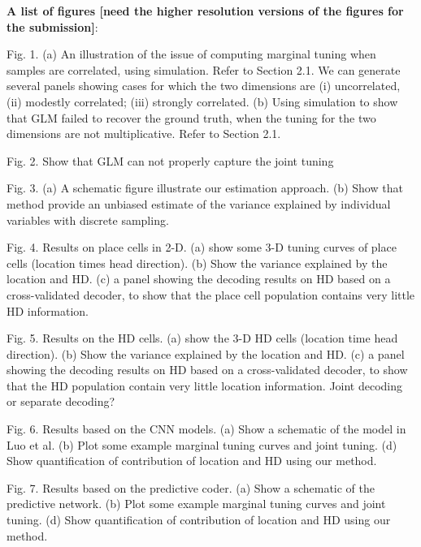 \documentclass[11pt]{article}
\begin{document}
\newpage

{\bf A list of figures [need the higher resolution versions of the figures for the submission]}:


Fig. 1. (a) An illustration of the issue of computing marginal tuning when samples are correlated, using simulation. Refer to Section 2.1. We can generate several panels showing cases for which the two dimensions are (i) uncorrelated, (ii) modestly correlated; (iii) strongly correlated. (b) Using simulation to show that GLM failed to recover the ground truth, when the tuning for the two dimensions are not multiplicative. Refer to Section 2.1. %

Fig. 2. Show that GLM can not properly capture the joint tuning



Fig. 3. (a) A schematic figure illustrate our estimation approach. (b) Show that method provide an unbiased estimate of the variance explained by individual variables with discrete sampling. %

Fig. 4. Results on place cells in 2-D. (a) show some 3-D tuning curves of place cells (location times head direction). (b) Show the variance explained by the location and HD.
(c) a panel showing the decoding results on HD based on a cross-validated decoder, to show that the place cell population contains very little HD information. 

Fig. 5. Results on the HD cells. (a) show the 3-D HD cells (location time head direction). (b) Show the variance explained by the location and HD. (c) a panel showing the decoding results on HD based on a cross-validated decoder, to show that the HD population contain very little location information. Joint decoding or separate decoding?


Fig. 6. Results based on the CNN models. (a) Show a schematic of the model in Luo et al. (b) Plot some example marginal tuning curves and joint tuning. (d) Show quantification of contribution of location and HD using our method. 

Fig. 7. Results based on the predictive coder. (a) Show a schematic of the predictive network. (b) Plot some example marginal tuning curves and joint tuning. (d) Show quantification of contribution of location and HD using our method. 
\end{document}
